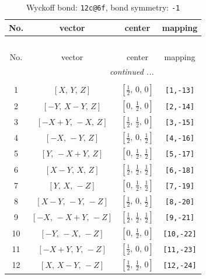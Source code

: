 \documentclass[fleqn,8pt]{jsarticle}
\begin{document}
\begin{longtable}{cccc}
\caption{Wyckoff bond: {\tt 12c@6f}, bond symmetry: {\tt -1}}
 \\
 \hline \hline
No. & vector & center & mapping \\ \hline \endfirsthead

\multicolumn{3}{l}{\tablename\ \thetable{}} \\
 \hline \hline
No. & vector & center & mapping \\ \hline \endhead

 \hline \hline
\multicolumn{3}{r}{\footnotesize\it continued ...} \\ \endfoot

 \hline \hline
\multicolumn{3}{r}{} \\ \endlastfoot

1 & $\left[ X,\, Y,\, Z \right]$ & $\left[ \frac{1}{2},\, 0,\, 0 \right]$ & {\tt [1,-13]} \\ \hline
2 & $\left[ - Y,\, X - Y,\, Z \right]$ & $\left[ 0,\, \frac{1}{2},\, 0 \right]$ & {\tt [2,-14]} \\ \hline
3 & $\left[ - X + Y,\, - X,\, Z \right]$ & $\left[ \frac{1}{2},\, \frac{1}{2},\, 0 \right]$ & {\tt [3,-15]} \\ \hline
4 & $\left[ - X,\, - Y,\, Z \right]$ & $\left[ \frac{1}{2},\, 0,\, \frac{1}{2} \right]$ & {\tt [4,-16]} \\ \hline
5 & $\left[ Y,\, - X + Y,\, Z \right]$ & $\left[ 0,\, \frac{1}{2},\, \frac{1}{2} \right]$ & {\tt [5,-17]} \\ \hline
6 & $\left[ X - Y,\, X,\, Z \right]$ & $\left[ \frac{1}{2},\, \frac{1}{2},\, \frac{1}{2} \right]$ & {\tt [6,-18]} \\ \hline
7 & $\left[ Y,\, X,\, - Z \right]$ & $\left[ 0,\, \frac{1}{2},\, \frac{1}{2} \right]$ & {\tt [7,-19]} \\ \hline
8 & $\left[ X - Y,\, - Y,\, - Z \right]$ & $\left[ \frac{1}{2},\, 0,\, \frac{1}{2} \right]$ & {\tt [8,-20]} \\ \hline
9 & $\left[ - X,\, - X + Y,\, - Z \right]$ & $\left[ \frac{1}{2},\, \frac{1}{2},\, \frac{1}{2} \right]$ & {\tt [9,-21]} \\ \hline
10 & $\left[ - Y,\, - X,\, - Z \right]$ & $\left[ 0,\, \frac{1}{2},\, 0 \right]$ & {\tt [10,-22]} \\ \hline
11 & $\left[ - X + Y,\, Y,\, - Z \right]$ & $\left[ \frac{1}{2},\, 0,\, 0 \right]$ & {\tt [11,-23]} \\ \hline
12 & $\left[ X,\, X - Y,\, - Z \right]$ & $\left[ \frac{1}{2},\, \frac{1}{2},\, 0 \right]$ & {\tt [12,-24]} \\
\end{longtable}
\end{document}
